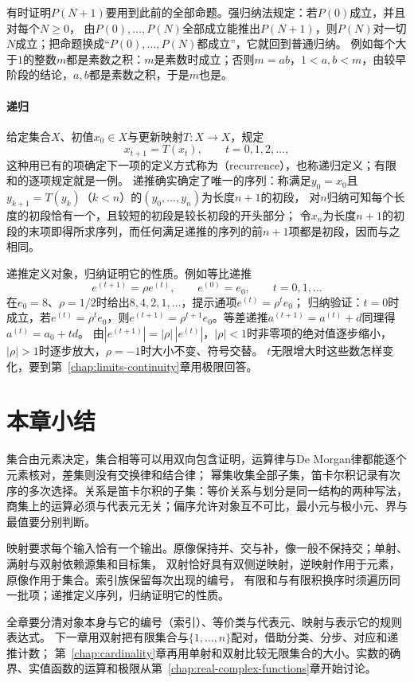 有时证明$P(N+1)$要用到此前的全部命题。强归纳法规定：若$P(0)$成立，并且对每个$N\geq0$，
由$P(0),\ldots,P(N)$全部成立能推出$P(N+1)$，则$P(N)$对一切$N$成立；把命题换成“$P(0),\ldots,P(N)$都成立”，它就回到普通归纳。
例如每个大于$1$的整数$m$都是素数之积：$m$是素数时成立；否则$m=ab$，$1<a,b<m$，由较早阶段的结论，$a,b$都是素数之积，于是$m$也是。

\paragraph{递归}
给定集合$X$、初值$x_0\in X$与更新映射$T:X\to X$，规定
\[
 x_{t+1}=T(x_t),\qquad t=0,1,2,\ldots,
\]
这种用已有的项确定下一项的定义方式称为（recurrence），也称递归定义；有限和的逐项规定就是一例。
递推确实确定了唯一的序列：称满足$y_0=x_0$且$y_{k+1}=T(y_k)$（$k<n$）的$(y_0,\ldots,y_n)$为长度$n+1$的初段，
对$n$归纳可知每个长度的初段恰有一个，且较短的初段是较长初段的开头部分；
令$x_n$为长度$n+1$的初段的末项即得所求序列，而任何满足递推的序列的前$n+1$项都是初段，因而与之相同。

递推定义对象，归纳证明它的性质。例如等比递推
\begin{equation}
 e^{(t+1)}=\rho e^{(t)},\qquad e^{(0)}=e_0,\qquad t=0,1,\ldots
 \label{eq:prelim-geometric-recurrence}
\end{equation}
在$e_0=8$、$\rho=1/2$时给出$8,4,2,1,\ldots$，提示通项$e^{(t)}=\rho^te_0$；
归纳验证：$t=0$时成立，若$e^{(t)}=\rho^te_0$，则$e^{(t+1)}=\rho^{t+1}e_0$。等差递推$a^{(t+1)}=a^{(t)}+d$同理得$a^{(t)}=a_0+td$。
由$|e^{(t+1)}|=|\rho|\,|e^{(t)}|$，$|\rho|<1$时非零项的绝对值逐步缩小，$|\rho|>1$时逐步放大，$\rho=-1$时大小不变、符号交替。
$t$无限增大时这些数怎样变化，要到第~\ref{chap:limits-continuity}章用极限回答。

\section{本章小结}
\label{sec:prelim-sets-functions-summary}

集合由元素决定，集合相等可以用双向包含证明，运算律与De Morgan律都能逐个元素核对，差集则没有交换律和结合律；
幂集收集全部子集，笛卡尔积记录有次序的多次选择。关系是笛卡尔积的子集：等价关系与划分是同一结构的两种写法，
商集上的运算必须与代表元无关；偏序允许对象互不可比，最小元与极小元、界与最值要分别判断。

映射要求每个输入恰有一个输出。原像保持并、交与补，像一般不保持交；单射、满射与双射依赖源集和目标集，
双射恰好具有双侧逆映射，逆映射作用于元素，原像作用于集合。索引族保留每次出现的编号，
有限和与有限积换序时须遍历同一批项；递推定义序列，归纳证明它的性质。

全章要分清对象本身与它的编号（索引）、等价类与代表元、映射与表示它的规则表达式。
下一章用双射把有限集合与$\{1,\ldots,n\}$配对，借助分类、分步、对应和递推计数；
第~\ref{chap:cardinality}章再用单射和双射比较无限集合的大小。实数的确界、实值函数的运算和极限从第~\ref{chap:real-complex-functions}章开始讨论。
